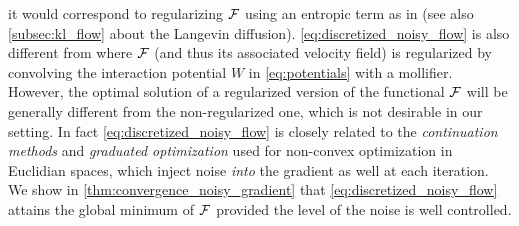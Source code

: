 it would correspond to regularizing ${{\mathcal F}}$ using an entropic term as in \cite{mei2018mean,csimcsekli2018sliced} (see also \cref{subsec:kl_flow} about the Langevin diffusion). \cref{eq:discretized_noisy_flow} is also different from \cite{craig2016blob,carrillo2019blob} where ${{\mathcal F}}$ (and thus its associated velocity field) is regularized by convolving the interaction potential $W$ in \cref{eq:potentials} with a mollifier. However, the optimal solution of a regularized version of the functional ${{\mathcal F}}$ will be generally different from the non-regularized one, which is not desirable in our setting. 
In fact \cref{eq:discretized_noisy_flow} is  closely related to the \textit{continuation methods} \cite{Gulcehre:2016a,Gulcehre:2016,Chaudhari:2017}  and \textit{graduated optimization} \cite{Hazan:2015} used for non-convex optimization in Euclidian spaces, which inject noise \textit{into} the gradient as well at each iteration. %
We show in \cref{thm:convergence_noisy_gradient} that \cref{eq:discretized_noisy_flow} attains the global minimum of ${{\mathcal F}}$ provided the level of the noise is well controlled.
